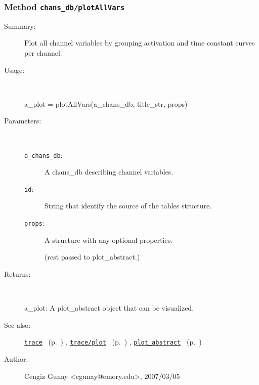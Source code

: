 \subsubsection[Method \texttt{plotAllVars}]{Method \texttt{chans\_db/plotAllVars}}%
%
\label{ref_chans_db__plotAllVars}%
\hypertarget{ref_chans_db__plotAllVars}{}%
\begin{description}
\item[Summary:]Plot all channel variables by grouping activation and time constant curves per channel.
%
\item[Usage:]~%
\begin{lyxcode}%
a\_plot = plotAllVars(a\_chans\_db, title\_str, props)
%
\end{lyxcode}%
%
%
\item[Parameters:]~
\begin{description}%
\item[\texttt{a\_chans\_db}:]
 A chans\_db describing channel variables.
\item[\texttt{id}:]
 String that identify the source of the tables structure.
\item[\texttt{props}:]
 A structure with any optional properties.

(rest passed to plot\_abstract.)
\end{description}%
%
\item[Returns:
]~

	a\_plot: A plot\_abstract object that can be visualized.
%
%
\item[See also:]%
\hyperlink{ref_trace}{\texttt{trace}}%
\ (p.~\pageref{ref_trace})%
%
, \hyperlink{ref_trace__plot}{\texttt{trace/plot}}%
\ (p.~\pageref{ref_trace__plot})%
%
, \hyperlink{ref_plot_abstract}{\texttt{plot\_abstract}}%
\ (p.~\pageref{ref_plot_abstract})%
%
%
\item[Author:]%
Cengiz Gunay <cgunay@emory.edu>, 2007/03/05
%
\end{description}
\methodline%
